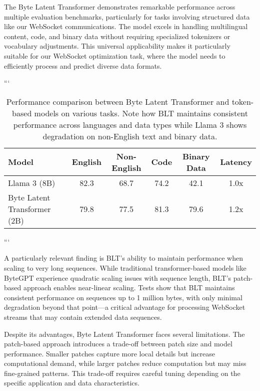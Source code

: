 \documentclass[a4paper, 11pt, twoside, openright]{report}
\begin{document}
The Byte Latent Transformer demonstrates remarkable performance across multiple evaluation benchmarks, particularly for tasks involving structured data like our WebSocket communications. The model excels in handling multilingual content, code, and binary data without requiring specialized tokenizers or vocabulary adjustments. This universal applicability makes it particularly suitable for our WebSocket optimization task, where the model needs to efficiently process and predict diverse data formats.

```
\begin{table}[h]
    \centering
    \caption{Performance comparison between Byte Latent Transformer and token-based models on various tasks. Note how BLT maintains consistent performance across languages and data types while Llama 3 shows degradation on non-English text and binary data.}
    \label{tab:blt_performance}
    \begin{tabular}{lccccc}
        \toprule
        \textbf{Model} & \textbf{English} & \textbf{Non-English} & \textbf{Code} & \textbf{Binary Data} & \textbf{Latency} \\
        \midrule
        Llama 3 (8B) & 82.3 & 68.7 & 74.2 & 42.1 & 1.0x \\
        Byte Latent Transformer (2B) & 79.8 & 77.5 & 81.3 & 79.6 & 1.2x \\
        \bottomrule
    \end{tabular}
\end{table}
```

A particularly relevant finding is BLT's ability to maintain performance when scaling to very long sequences. While traditional transformer-based models like ByteGPT \cite{ByteGPT2024} experience quadratic scaling issues with sequence length, BLT's patch-based approach enables near-linear scaling. Tests show that BLT maintains consistent performance on sequences up to 1 million bytes, with only minimal degradation beyond that point—a critical advantage for processing WebSocket streams that may contain extended data sequences.

Despite its advantages, Byte Latent Transformer faces several limitations. The patch-based approach introduces a trade-off between patch size and model performance. Smaller patches capture more local details but increase computational demand, while larger patches reduce computation but may miss fine-grained patterns. This trade-off requires careful tuning depending on the specific application and data characteristics.
\end{document}
